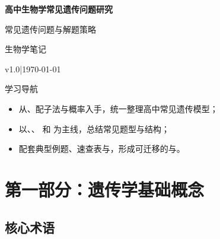 \documentclass[a4paper,11pt]{ctexart}
\renewcommand{\notetitle}{高中生物学常见遗传问题研究}
\renewcommand{\noteauthor}{生物学笔记}
\renewcommand{\notedate}{\today}
\renewcommand{\notesubtitle}{常见遗传问题与解题策略}
\renewcommand{\noteversion}{v1.0}
\begin{document}
\thispagestyle{empty}
\setcounter{page}{1}

\noindent
\begin{minipage}[t][0.7\textheight][c]{\textwidth}
  \raggedleft
  \vspace*{\fill}
  {\sffamily\bfseries\Huge\color{accent}\notetitle\par}
  \vspace{0.6em}
  {\Large\color{inkgray}\notesubtitle\par}
  \vspace{0.5em}
  {\large\color{inkgray}\noteauthor\par}
  \vspace{0.4em}
  {\normalsize\color{inkgray}\noteversion\quad|\quad\notedate\par}
  \vspace*{\fill}
\end{minipage}

\begin{center}
\begin{minipage}{0.84\textwidth}
  \textcolor{inkgray}{\sffamily\small 学习导航}\\
  \begin{itemize}
    \item 从、配子法与概率入手，统一整理高中常见遗传模型；
    \item 以、、 和  为主线，总结常见题型与结构；
    \item 配套典型例题、速查表与，形成可迁移的与。
  \end{itemize}
\end{minipage}
\end{center}
\vspace{1em}

\clearpage
\thispagestyle{plain}
\tableofcontents
\newpage


\section{第一部分：遗传学基础概念}

\subsection{核心术语}
\end{document}
